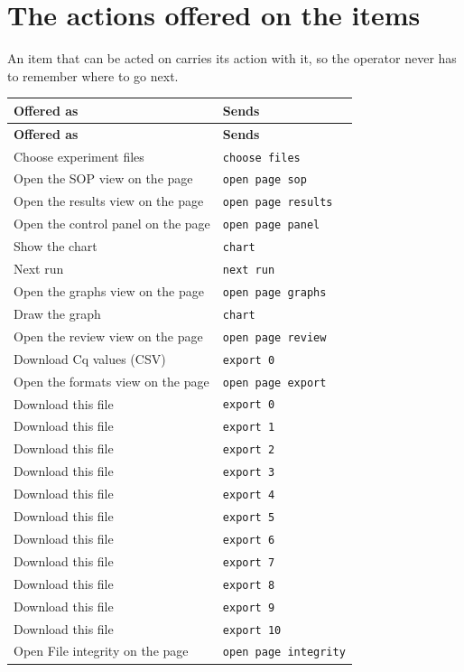\section{The actions offered on the items}
An item that can be acted on carries its action with it, so the operator never has
to remember where to go next.

{\small
\begin{longtable}{@{}ll@{}}
\toprule \textbf{Offered as} & \textbf{Sends} \\\midrule\endfirsthead
\toprule \textbf{Offered as} & \textbf{Sends} \\\midrule\endhead
Choose experiment files & \texttt{choose files} \\
Open the SOP view on the page & \texttt{open page sop} \\
Open the results view on the page & \texttt{open page results} \\
Open the control panel on the page & \texttt{open page panel} \\
Show the chart & \texttt{chart} \\
Next run & \texttt{next run} \\
Open the graphs view on the page & \texttt{open page graphs} \\
Draw the graph & \texttt{chart} \\
Open the review view on the page & \texttt{open page review} \\
Download Cq values (CSV) & \texttt{export 0} \\
Open the formats view on the page & \texttt{open page export} \\
Download this file & \texttt{export 0} \\
Download this file & \texttt{export 1} \\
Download this file & \texttt{export 2} \\
Download this file & \texttt{export 3} \\
Download this file & \texttt{export 4} \\
Download this file & \texttt{export 5} \\
Download this file & \texttt{export 6} \\
Download this file & \texttt{export 7} \\
Download this file & \texttt{export 8} \\
Download this file & \texttt{export 9} \\
Download this file & \texttt{export 10} \\
Open File integrity on the page & \texttt{open page integrity} \\
\bottomrule
\end{longtable}}


